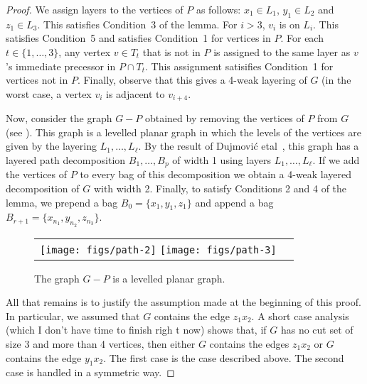 \documentclass{patmorin}
\begin{document}
\begin{proof}
  We assign layers to the vertices of $P$ as follows: $x_1\in
  L_1$, $y_1\in L_2$ and $z_1\in L_3$.  This satisfies Condition~3
  of the lemma. For $i> 3$, $v_i$ is on $L_{i}$.  This satisfies
  Condition~5 and satisfies Condition~1 for vertices in $P$.  For each
  $t\in\{1,\ldots,3\}$, any vertex $v\in T_t$ that is not in $P$ is
  assigned to the same layer as $v$'s immediate precessor in $P\cap T_t$.
  This assignment satisifies Condition~1 for vertices not in $P$.
  Finally, observe that this gives a 4-weak layering of $G$ (in the
  worst case, a vertex $v_i$ is adjacent to $v_{i+4}$.

  Now, consider the graph $G-P$ obtained by removing the vertices of
  $P$ from $G$ (see ).  This graph is a levelled planar graph in which the
  levels of the vertices are given by the layering $L_1,\ldots,L_\ell$.
  By the result of Dujmovi\'c etal\ \cite[Proof of Theorem~5]{jxx},
  this graph has a layered path decomposition $B_1,\ldots,B_p$ of
  width 1 using layers $L_1,\ldots,L_\ell$.  If we add the vertices
  of $P$ to every bag of this decomposition we obtain a 4-weak layered
  decomposition of $G$ with width 2.  Finally, to satisfy Conditions
  2 and 4 of the lemma, we prepend a bag $B_0=\{x_1,y_1,z_1\}$ and append a bag
  $B_{r+1}=\{x_{n_1},y_{n_2},z_{n_3}\}$.

  \begin{figure}
  \begin{center}
  \begin{tabular}{cc}
  \texttt{[image: figs/path-2]}
  \texttt{[image: figs/path-3]}
  \end{tabular}
  \end{center}
  \caption{The graph $G-P$ is a levelled planar graph.}
  \end{figure}

  All that remains is to justify the assumption made at the beginning
  of this proof.  In particular, we assumed that $G$ contains the
  edge $z_1x_2$.  A short case analysis (which I don't have time to finish righ t now) shows that, if $G$ has no cut set of size 3 and more than 4 vertices, then either $G$ contains the edges $z_1x_2$ or $G$ contains the edge $y_1x_2$.  The first case is the case described above. The second case is handled in a symmetric way.
\end{proof}
\end{document}
